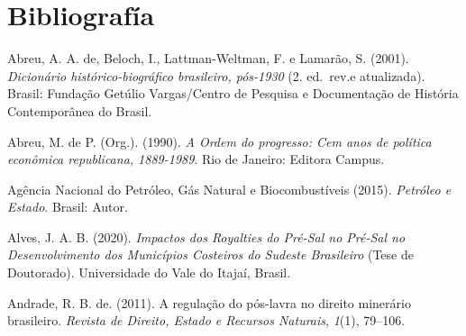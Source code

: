 \documentclass[11pt,letterpaper]{article}
\begin{document}
\section{Bibliografía}

\begin{hangparas}{6.2mm}{1}
	Abreu, A. A. de, Beloch, I., Lattman-Weltman, F. e Lamarão, S. (2001).	\emph{Dicionário histórico-biográfico brasileiro, pós-1930} (2. ed.~rev.e atualizada). Brasil: Fundação Getúlio Vargas/Centro de Pesquisa e	Documentação de História Contemporânea do Brasil.
	
	Abreu, M. de P. (Org.). (1990). \emph{A Ordem do progresso: Cem anos de	política econômica republicana, 1889-1989}. Rio de Janeiro: Editora Campus.
	
	Agência Nacional do Petróleo, Gás Natural e Biocombustíveis (2015).	\emph{Petróleo e Estado}. Brasil: Autor. 
	
	Alves, J. A. B. (2020). \emph{Impactos dos Royalties do Pré-Sal no Pré-Sal no Desenvolvimento dos Municípios Costeiros do Sudeste	Brasileiro} (Tese de Doutorado). Universidade do Vale do Itajaí, Brasil.
	
	Andrade, R. B. de. (2011). A regulação do pós-lavra no direito minerário brasileiro. \emph{Revista de Direito, Estado e Recursos Naturais},	\emph{1}(1), 79--106.
	
\end{hangparas}
 	
\end{document}
